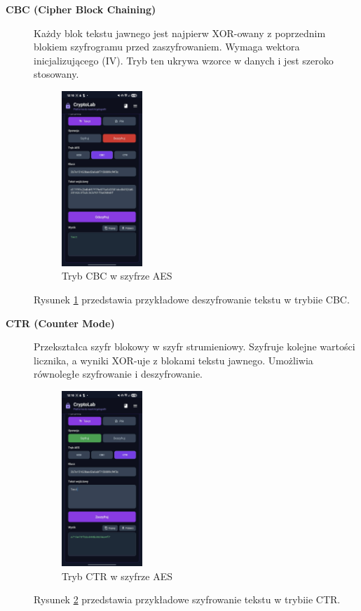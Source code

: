 \documentclass[12pt,a4paper]{article}
\begin{document}
\begin{description}
    \item[\textbf{CBC (Cipher Block Chaining)}] 
    Każdy blok tekstu jawnego jest najpierw XOR-owany z poprzednim blokiem szyfrogramu przed zaszyfrowaniem. 
    Wymaga wektora inicjalizującego (IV). Tryb ten ukrywa wzorce w danych i jest szeroko stosowany.
    \begin{figure}
        \centering
        \includegraphics[width=0.3\textwidth]{img/CBC.jpg}
        \caption{Tryb CBC w szyfrze AES}
        \label{fig:cbc}
    \end{figure}
    Rysunek \ref{fig:cbc} przedstawia przykładowe deszyfrowanie tekstu w trybiie CBC.
    \item[\textbf{CTR (Counter Mode)}] 
    Przekształca szyfr blokowy w szyfr strumieniowy. 
    Szyfruje kolejne wartości licznika, a wyniki XOR-uje z blokami tekstu jawnego. 
    Umożliwia równoległe szyfrowanie i deszyfrowanie.
    \begin{figure}
        \centering
        \includegraphics[width=0.3\textwidth]{img/CTR.jpg}
        \caption{Tryb CTR w szyfrze AES}
        \label{fig:ctr}
    \end{figure}
    Rysunek \ref{fig:ctr} przedstawia przykładowe szyfrowanie tekstu w trybiie CTR.
\end{description}
\end{document}
